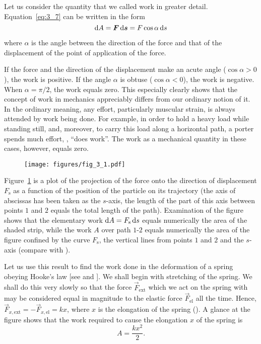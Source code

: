 Let us consider the quantity that we called work in greater detail. Equation~\eqref{eq:3_7} can be written in the form
\begin{equation}\label{eq:3_12}
\mathrm{d}A = \boldsymbol{F}\,\mathrm{d}\boldsymbol{s} = F\cos\alpha\,\mathrm{d} s
\end{equation}

\noindent
where $\alpha$ is the angle between the direction of the force and that of the displacement of the point of application of the force.

If the force and the direction of the displacement make an
acute angle ($\cos\alpha>0$), the work is positive. If the angle $\alpha$ is obtuse ($\cos\alpha<0$), the work is negative. When $\alpha=\pi/2$, the work equals zero. This especially clearly shows that the concept of work in mechanics appreciably differs from our ordinary notion of it. In the ordinary meaning, any effort, particularly muscular strain, is always attended by work being done. For example, in order to hold a heavy load while standing still, and, moreover, to carry this load along a horizontal path, a porter spends much effort, \ie, ``does work''. The work as a mechanical quantity in these cases, however, equals zero.

\begin{figure}[t]
	\begin{center}
		\texttt{[image: figures/fig\_3\_1.pdf]}
		\caption[]{}
		\label{fig:3_1}
	\end{center}
	\vspace{-0.7cm}
\end{figure}

Figure~\ref{fig:3_1} is a plot of the projection of the force onto the direction of displacement $F_{\text{s}}$ as a function of the position of the particle on its trajectory (the axis of abscissas has been taken as the $s$-axis, the length of the part of this axis between points $1$ and $2$ equals the total length of the path). Examination of the figure shows that the elementary work $\mathrm{d} A=F_{\text{s}}\,\mathrm{d} s$ equals numerically the area of the shaded strip, while the work $A$ over path $1$-$2$ equals numerically the area of the figure confined by the curve $F_{\text{s}}$, the vertical lines from points $1$ and $2$ and the $s$-axis (compare with ).

Let us use this result to find the work done in the deformation of a spring obeying Hooke's law [see  and ]. We shall begin with stretching of the spring. We shall do this very slowly so that the force $\vec{F}_{\text{ext}}$ which we act on the spring with may be considered equal in magnitude to the elastic force $\vec{F}_{\text{el}}$ all the time. Hence, $\vec{F}_{x,\text{ext}}=-\vec{F}_{x,\text{el}}=kx$, where $x$ is the elongation of the spring (). A glance at the figure shows that the work required to cause the elongation $x$ of the spring is
\begin{equation}\label{eq:3_13}
A = \frac{kx^2}{2}.
\end{equation}

